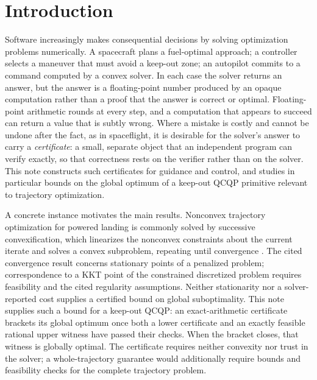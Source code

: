 \documentclass[11pt]{article}
\theoremstyle{plain}
\theoremstyle{remark}
\begin{document}
\section{Introduction}
\label{sec:intro}

Software increasingly makes consequential decisions by solving optimization
problems numerically. A spacecraft plans a fuel-optimal approach; a controller
selects a maneuver that must avoid a keep-out zone; an autopilot commits to a
command computed by a convex solver. In each case the solver returns an answer,
but the answer is a floating-point number produced by an opaque computation
rather than a proof that the answer is correct or optimal. Floating-point
arithmetic rounds at every step, and a computation that appears to succeed can
return a value that is subtly wrong. Where a mistake is costly and cannot be
undone after the fact, as in spaceflight, it is desirable for the solver's
answer to carry a \emph{certificate}: a small, separate object that an
independent program can verify exactly, so that correctness rests on the
verifier rather than on the solver. This note constructs such certificates for
guidance and control, and studies in particular bounds on the global optimum
of a keep-out QCQP primitive relevant to trajectory optimization.

A concrete instance motivates the main results. Nonconvex trajectory
optimization for powered landing is commonly
solved by successive convexification, which linearizes the nonconvex constraints
about the current iterate and solves a convex subproblem, repeating until
convergence \cite{elango2025}. The cited convergence result concerns stationary
points of a penalized problem; correspondence to a KKT point of the constrained
discretized problem requires feasibility and the cited regularity assumptions.
Neither stationarity nor a solver-reported cost
supplies a certified bound on global suboptimality. This note supplies such a
bound for a keep-out QCQP: an exact-arithmetic certificate brackets its global
optimum once both a lower certificate and an exactly feasible rational upper
witness have passed their checks. When the bracket closes, that witness is
globally optimal. The certificate requires neither convexity nor trust in the
solver; a whole-trajectory guarantee would additionally require bounds and
feasibility checks for the complete trajectory problem.
\end{document}

